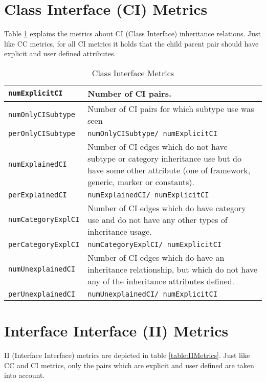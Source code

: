 \documentclass{uvamscse}
\begin{document}
\section{Class Interface (CI) Metrics}
Table \ref{table:CIMetrics} explains the metrics about CI (Class Interface) inheritance relations. Just like CC metrics, for all CI metrics it holds that the child parent pair should have explicit and user defined attributes.

\begin{table} [h!]
\begin{flushleft}
\begin{tabular}[c]{| p{40mm} | p{110mm} |}
  \hline
  \texttt{numExplicitCI} &  Number of CI pairs.\\
  \hline  
  \texttt{numOnlyCISubtype} &  Number of CI pairs for which subtype use was seen \\
  \texttt{perOnlyCISubtype} &  \texttt{numOnlyCISubtype/ numExplicitCI} \\
  \hline
  \texttt{numExplainedCI} & Number of CI edges which do not have subtype or category inheritance use but do have some other attribute (one of framework, generic, marker or constants). \\
  \texttt{perExplainedCI} & 	\texttt{numExplainedCI/ numExplicitCI} \\
  \hline 
  \texttt{numCategoryExplCI} & Number of CI edges which do have category use and do not have any other types of inheritance usage. \\
  \texttt{perCategoryExplCI} & 	\texttt{numCategoryExplCI/ numExplicitCI} \\
  \hline 
  \texttt{numUnexplainedCI} & Number of CI edges which do have an inheritance relationship, but which do not have any of the inheritance attributes defined. \\
  \texttt{perUnexplainedCI} & 	\texttt{numUnexplainedCI/ numExplicitCI } \\
  \hline 
\end{tabular}
\end{flushleft}
\caption{Class Interface Metrics}
\label{table:CIMetrics}
\end{table}


\section{Interface Interface (II) Metrics}
II (Interface Interface) metrics are depicted in table \ref{table:IIMetrics}. Just like CC and CI metrics, only the pairs which are explicit and user defined are taken into account.
\end{document}
